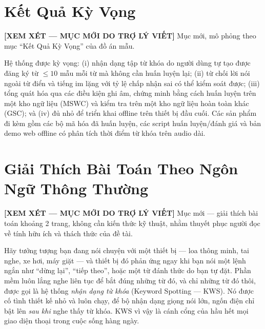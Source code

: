 \documentclass[12pt,a4paper]{report}
\newcommand{\reviewnote}[1]{%
  \par\smallskip\noindent
  \colorbox{yellow!35}{\parbox{0.97\linewidth}{\small\textbf{[XEM XÉT — MỤC MỚI DO TRỢ LÝ VIẾT]}\; #1}}%
  \par\smallskip}
\begin{document}
\section{Kết Quả Kỳ Vọng}\label{sec:outcomes}
\reviewnote{Mục mới, mô phỏng theo mục ``Kết Quả Kỳ Vọng'' của đồ án mẫu.}

Hệ thống được kỳ vọng: (i) nhận dạng tập từ khóa do người dùng tự tạo được đăng
ký từ $\le 10$ mẫu mỗi từ mà không cần huấn luyện lại; (ii) từ chối lời nói ngoài
từ điển và tiếng im lặng với tỷ lệ chấp nhận sai có thể kiểm soát được; (iii) tổng
quát hóa qua các điều kiện ghi âm, chứng minh bằng cách huấn luyện trên một kho
ngữ liệu (MSWC) và kiểm tra trên một kho ngữ liệu hoàn toàn khác (GSC); và (iv) đủ
nhỏ để triển khai offline trên thiết bị đầu cuối. Các sản phẩm đi kèm gồm các bộ
mã hóa đã huấn luyện, các script huấn luyện/đánh giá và bản demo web offline có
phân tích thời điểm từ khóa trên audio dài.

\section{Giải Thích Bài Toán Theo Ngôn Ngữ Thông Thường}\label{sec:plain}
\reviewnote{Mục mới --- giải thích bài toán khoảng 2 trang, không cần kiến thức
kỹ thuật, nhằm thuyết phục người đọc về tính hữu ích và thách thức của đề tài.}

Hãy tưởng tượng bạn đang nói chuyện với một thiết bị --- loa thông minh, tai
nghe, xe hơi, máy giặt --- và thiết bị đó phản ứng ngay khi bạn nói một lệnh
ngắn như ``dừng lại'', ``tiếp theo'', hoặc một từ đánh thức do bạn tự đặt. Phần
mềm luôn lắng nghe liên tục để bắt đúng những từ đó, và chỉ những từ đó thôi, được
gọi là hệ thống \emph{nhận dạng từ khóa} (Keyword Spotting --- KWS). Nó được cố
tình thiết kế nhỏ và luôn chạy, để bộ nhận dạng giọng nói lớn, ngốn điện chỉ bật
lên \emph{sau khi} nghe thấy từ khóa. KWS vì vậy là cánh cổng của hầu hết mọi
giao diện thoại trong cuộc sống hàng ngày.
\end{document}
